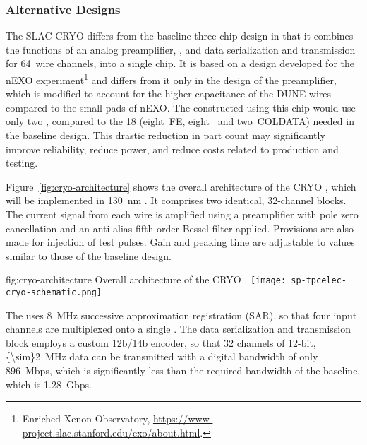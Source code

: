 \subsubsection{Alternative Designs}
\label{sec:fdsp-tpcelec-design-femb-alt}

\label{sec:fdsp-tpcelec-design-femb-alt-cryo}

The SLAC CRYO  differs from the baseline three-chip design in that it combines the functions of an analog preamplifier, , and data serialization and transmission for \num{64}~wire channels, into a single chip.
It is based on a design developed for the nEXO experiment\footnote{Enriched Xenon Observatory, \url{https://www-project.slac.stanford.edu/exo/about.html}.} and differs from it only in the design of the preamplifier, which is modified to account for the higher capacitance of the DUNE  wires compared to the small pads of nEXO.
The  constructed using this chip would use only two , compared to the \num{18} (eight~FE, eight~ and two~COLDATA) needed in the baseline design.
This drastic reduction in part count may significantly improve  reliability, reduce power, and reduce costs related to production and testing. 

Figure~\ref{fig:cryo-architecture} shows the overall architecture of the CRYO , which will be implemented in \SI{130}{nm} .
It comprises two identical, \num{32}-channel blocks. 
The current signal from each wire is amplified using a preamplifier with pole zero cancellation and an anti-alias fifth-order Bessel filter applied. 
Provisions are also made for injection of test pulses. 
Gain and peaking time are adjustable to values similar to those of the baseline design.

\begin{dunefigure}
{fig:cryo-architecture}
{Overall architecture of the CRYO .}
\texttt{[image: sp-tpcelec-cryo-schematic.png]}
\end{dunefigure}

The  uses \SI{8}{MHz} successive approximation registration (SAR), so that four input channels are multiplexed onto a single . The data serialization and transmission block employs a custom 12b/14b encoder, so that \num{32} channels of \num{12}-bit, \SI{{\sim}2}{MHz} data can be transmitted with a digital bandwidth of only \SI{896}{Mbps}, which is significantly less than the required bandwidth of the baseline, which is \SI{1.28}{Gbps}.

